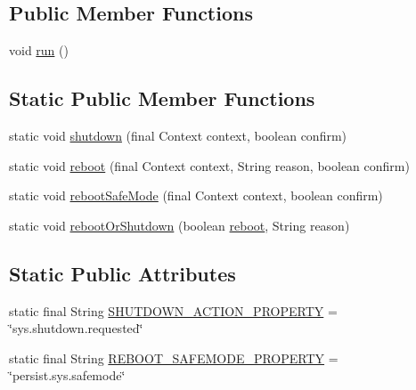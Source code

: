 \subsection*{Public Member Functions}
\begin{DoxyCompactItemize}
\item 
void \hyperlink{classcom_1_1android_1_1server_1_1power_1_1ShutdownThread_ad9969aac72e7f49f7b08e17d6b59005a}{run} ()
\end{DoxyCompactItemize}
\subsection*{Static Public Member Functions}
\begin{DoxyCompactItemize}
\item 
static void \hyperlink{classcom_1_1android_1_1server_1_1power_1_1ShutdownThread_a63768a95fa2cfd26dd0eea8260dbdc05}{shutdown} (final Context context, boolean confirm)
\item 
static void \hyperlink{classcom_1_1android_1_1server_1_1power_1_1ShutdownThread_abd09f9232c1dd018495d628ef3f5c30d}{reboot} (final Context context, String reason, boolean confirm)
\item 
static void \hyperlink{classcom_1_1android_1_1server_1_1power_1_1ShutdownThread_a7dd8f5ff965bbfd5c685ec4212841d6c}{reboot\-Safe\-Mode} (final Context context, boolean confirm)
\item 
static void \hyperlink{classcom_1_1android_1_1server_1_1power_1_1ShutdownThread_a60e6c04cfc401c44b85e6e7ea4d4f453}{reboot\-Or\-Shutdown} (boolean \hyperlink{classcom_1_1android_1_1server_1_1power_1_1ShutdownThread_abd09f9232c1dd018495d628ef3f5c30d}{reboot}, String reason)
\end{DoxyCompactItemize}
\subsection*{Static Public Attributes}
\begin{DoxyCompactItemize}
\item 
static final String \hyperlink{classcom_1_1android_1_1server_1_1power_1_1ShutdownThread_a0725ea116927cc0e8dbb1e9c717159a7}{S\-H\-U\-T\-D\-O\-W\-N\-\_\-\-A\-C\-T\-I\-O\-N\-\_\-\-P\-R\-O\-P\-E\-R\-T\-Y} = \char`\"{}sys.\-shutdown.\-requested\char`\"{}
\item 
static final String \hyperlink{classcom_1_1android_1_1server_1_1power_1_1ShutdownThread_a2992de9d96ecc0f7a6879c276cb06e07}{R\-E\-B\-O\-O\-T\-\_\-\-S\-A\-F\-E\-M\-O\-D\-E\-\_\-\-P\-R\-O\-P\-E\-R\-T\-Y} = \char`\"{}persist.\-sys.\-safemode\char`\"{}
\end{DoxyCompactItemize}
